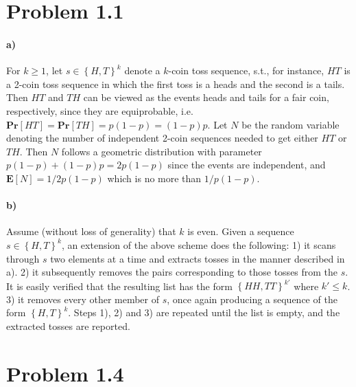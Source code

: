 \documentclass[12pt]{article}
\begin{document}
\section*{Problem 1.1}
\paragraph{a)} For $k \geq 1$, let $s \in \left\{ H,T \right\}^k$ denote a $k$-coin toss sequence, s.t., for instance, $HT$ is a 2-coin toss sequence in which the first toss is a heads and the second is a tails. Then $HT$ and $TH$ can be viewed as the events heads and tails for a fair coin, respectively, since they are equiprobable, i.e. $\textbf{Pr}\left[ HT \right] = \textbf{Pr}\left[ TH \right] = p(1-p)=(1-p)p$. Let $N$ be the random variable denoting the number of independent 2-coin sequences needed to get either $HT$ or $TH$. Then $N$ follows a geometric distribution with parameter $p(1-p) + (1-p)p = 2p(1-p)$ since the events are independent, and $\mathbf{E}\left[ N \right] = 1/2p(1-p)$ which is no more than $1/p(1-p)$.

\paragraph{b)} Assume (without loss of generality) that $k$ is even. Given a sequence $s \in \left\{ H,T \right\}^k$, an extension of the above scheme does the following: 1) it scans through $s$ two elements at a time and extracts tosses in the manner described in a). 2) it subsequently removes the pairs corresponding to those tosses from the $s$. It is easily verified that the resulting list has the form $\left\{ HH,TT \right\}^{k'}$ where $k' \leq k$. 3) it removes every other member of $s$, once again producing a sequence of the form $\left\{ H,T \right\}^k$. Steps 1), 2) and 3) are repeated until the list is empty, and the extracted tosses are reported.

\section*{Problem 1.4}
\end{document}
